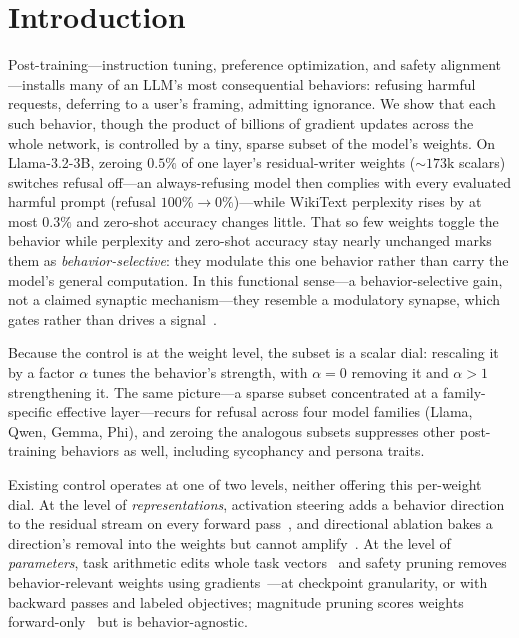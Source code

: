 \section{Introduction}
\label{sec:intro}

Post-training---instruction tuning, preference optimization, and safety alignment---installs many of
an LLM's most consequential behaviors: refusing harmful requests, deferring to a user's framing,
admitting ignorance. We show that each such behavior, though the product of billions of gradient
updates across the whole network, is controlled by a tiny, sparse subset of the model's weights. On
Llama-3.2-3B, zeroing $0.5\%$ of one layer's residual-writer weights ($\sim\!173$k scalars) switches
refusal off---an always-refusing model then complies with every evaluated harmful prompt (refusal
$100\%\!\to\!0\%$)---while WikiText perplexity rises by at most $0.3\%$ and zero-shot accuracy changes
little. That so few weights toggle the behavior while perplexity and zero-shot accuracy stay nearly
unchanged marks them as \emph{behavior-selective}: they modulate this one behavior rather than carry
the model's general computation. In this functional sense---a behavior-selective gain, not a claimed
synaptic mechanism---they resemble a modulatory synapse, which gates rather than drives a
signal~\cite{sherman1998thalamus}.

Because the control is at the weight level, the subset is a scalar dial: rescaling it by a factor
$\alpha$ tunes the behavior's strength, with $\alpha{=}0$ removing it and $\alpha{>}1$ strengthening
it. The same picture---a sparse subset concentrated at a family-specific effective layer---recurs for
refusal across four model families (Llama, Qwen, Gemma, Phi), and zeroing the analogous subsets
suppresses other post-training behaviors as well, including sycophancy and persona traits.

Existing control operates at one of two levels, neither offering this per-weight dial. At the level
of \emph{representations}, activation steering adds a behavior direction to the residual stream on
every forward pass~\cite{zou2023repe,rimsky2024caa,turner2024actadd}, and directional ablation bakes
a direction's removal into the weights but cannot amplify~\cite{arditi2024refusal}. At the level of
\emph{parameters}, task arithmetic edits whole task vectors~\cite{ilharco2023task} and safety pruning
removes behavior-relevant weights using gradients~\cite{wei2024brittleness,orgad2026harmful}---at
checkpoint granularity, or with backward passes and labeled objectives; magnitude pruning scores
weights forward-only~\cite{sun2023wanda} but is behavior-agnostic.

